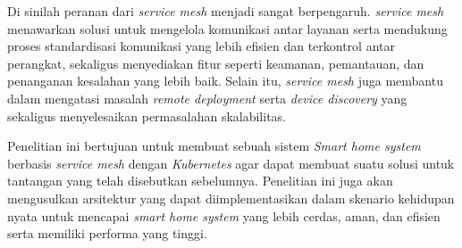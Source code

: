 Di sinilah peranan dari \textit{service mesh} menjadi sangat berpengaruh. \textit{service mesh} menawarkan solusi untuk mengelola komunikasi antar layanan serta mendukung proses standardisasi komunikasi yang lebih efisien dan terkontrol antar perangkat, sekaligus menyediakan fitur seperti keamanan, pemantauan, dan penanganan kesalahan yang lebih baik. Selain itu, \textit{service mesh} juga membantu dalam mengatasi masalah \textit{remote deployment} serta \textit{device discovery} yang sekaligus menyelesaikan permasalahan skalabilitas.

Penelitian ini bertujuan untuk membuat sebuah sistem \textit{Smart home system} berbasis \textit{service mesh} dengan \textit{Kubernetes} agar dapat membuat suatu solusi untuk tantangan yang telah disebutkan sebelumnya. Penelitian ini juga akan mengusulkan arsitektur yang dapat diimplementasikan dalam skenario kehidupan nyata untuk mencapai \textit{smart home system} yang lebih cerdas, aman, dan efisien serta memiliki performa yang tinggi.